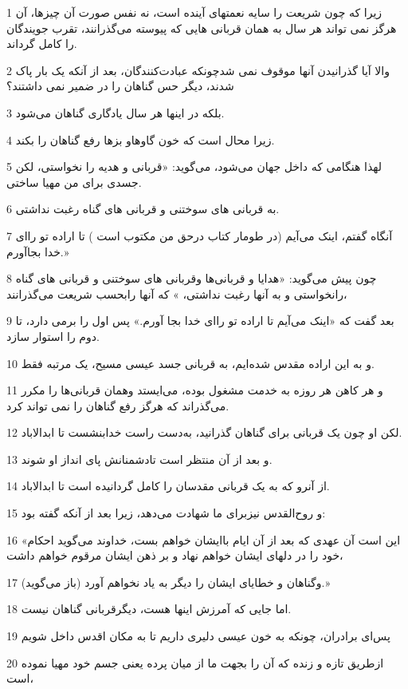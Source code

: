 \par 1 زیرا که چون شریعت را سایه نعمتهای آینده است، نه نفس صورت آن چیزها، آن هرگز نمی تواند هر سال به همان قربانی هایی که پیوسته می‌گذرانند، تقرب جویندگان را کامل گرداند.
\par 2 والا آیا گذرانیدن آنها موقوف نمی شدچونکه عبادت‌کنندگان، بعد از آنکه یک بار پاک شدند، دیگر حس گناهان را در ضمیر نمی داشتند؟
\par 3 بلکه در اینها هر سال یادگاری گناهان می‌شود.
\par 4 زیرا محال است که خون گاوهاو بزها رفع گناهان را بکند.
\par 5 لهذا هنگامی که داخل جهان می‌شود، می‌گوید: «قربانی و هدیه را نخواستی، لکن جسدی برای من مهیا ساختی.
\par 6 به قربانی های سوختنی و قربانی های گناه رغبت نداشتی.
\par 7 آنگاه گفتم، اینک می‌آیم (در طومار کتاب درحق من مکتوب است ) تا اراده تو را‌ای خدا بجاآورم.»
\par 8 چون پیش می‌گوید: «هدایا و قربانی‌ها وقربانی های سوختنی و قربانی های گناه رانخواستی و به آنها رغبت نداشتی، » که آنها رابحسب شریعت می‌گذرانند،
\par 9 بعد گفت که «اینک می‌آیم تا اراده تو را‌ای خدا بجا آورم.» پس اول را برمی دارد، تا دوم را استوار سازد.
\par 10 و به این اراده مقدس شده‌ایم، به قربانی جسد عیسی مسیح، یک مرتبه فقط.
\par 11 و هر کاهن هر روزه به خدمت مشغول بوده، می‌ایستد وهمان قربانی‌ها را مکرر می‌گذراند که هرگز رفع گناهان را نمی تواند کرد.
\par 12 لکن او چون یک قربانی برای گناهان گذرانید، به‌دست راست خدابنشست تا ابدالاباد.
\par 13 و بعد از آن منتظر است تادشمنانش پای انداز او شوند.
\par 14 از آنرو که به یک قربانی مقدسان را کامل گردانیده است تا ابدالاباد.
\par 15 و روح‌القدس نیزبرای ما شهادت می‌دهد، زیرا بعد از آنکه گفته بود:
\par 16 «این است آن عهدی که بعد از آن ایام باایشان خواهم بست، خداوند می‌گوید احکام خود را در دلهای ایشان خواهم نهاد و بر ذهن ایشان مرقوم خواهم داشت،
\par 17 (باز می‌گوید) وگناهان و خطایای ایشان را دیگر به یاد نخواهم آورد.»
\par 18 اما جایی که آمرزش اینها هست، دیگرقربانی گناهان نیست.
\par 19 پس‌ای برادران، چونکه به خون عیسی دلیری داریم تا به مکان اقدس داخل شویم
\par 20 ازطریق تازه و زنده که آن را بجهت ما از میان پرده یعنی جسم خود مهیا نموده است،
